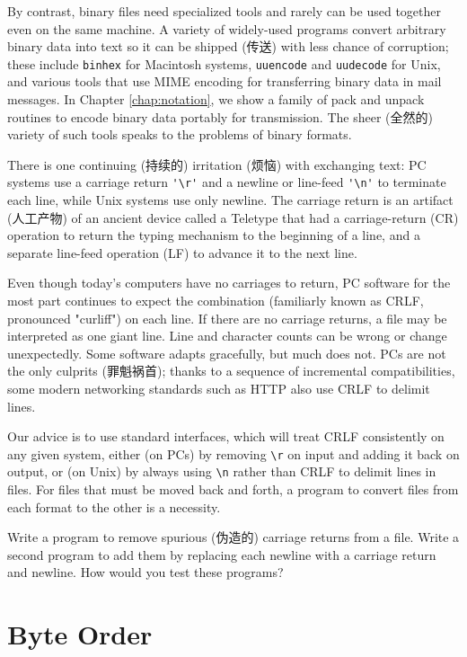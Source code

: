 By contrast, binary files need specialized tools and rarely can be used
together even on the same machine. A variety of widely-used programs
convert arbitrary binary data into text so it can be shipped (传送) with
less chance of corruption; these include \verb'binhex' for Macintosh
systems, \verb'uuencode' and \verb'uudecode' for Unix, and various tools
that use MIME encoding for transferring binary data in mail messages. In
Chapter \ref{chap:notation}, we show a family of pack and unpack routines
to encode binary data portably for transmission. The sheer (全然的) variety
of such tools speaks to the problems of binary formats.

There is one continuing (持续的) irritation (烦恼) with exchanging text: PC
systems use a carriage return \verb"'\r'" and a newline or line-feed
\verb"'\n'" to terminate each line, while Unix systems use only newline.
The carriage return is an artifact (人工产物) of an ancient device called a
Teletype that had a carriage-return (CR) operation to return the typing
mechanism to the beginning of a line, and a separate line-feed operation
(LF) to advance it to the next line.

Even though today's computers have no carriages to return, PC software for
the most part continues to expect the combination (familiarly known as
CRLF, pronounced "curliff") on each line. If there are no carriage returns,
a file may be interpreted as one giant line. Line and character counts can
be wrong or change unexpectedly. Some software adapts gracefully, but much
does not. PCs are not the only culprits (罪魁祸首); thanks to a sequence of
incremental compatibilities, some modern networking standards such as HTTP
also use CRLF to delimit lines.

Our advice is to use standard interfaces, which will treat CRLF
consistently on any given system, either (on PCs) by removing \verb'\r' on
input and adding it back on output, or (on Unix) by always using \verb'\n'
rather than CRLF to delimit lines in files.  For files that must be moved
back and forth, a program to convert files from each format to the other is
a necessity.

\begin{exercise}
    Write a program to remove spurious (伪造的) carriage returns from a
    file. Write a second program to add them by replacing each newline with
    a carriage return and newline. How would you test these programs?
\end{exercise}

\section{Byte Order}
\label{sec:byte_order}

